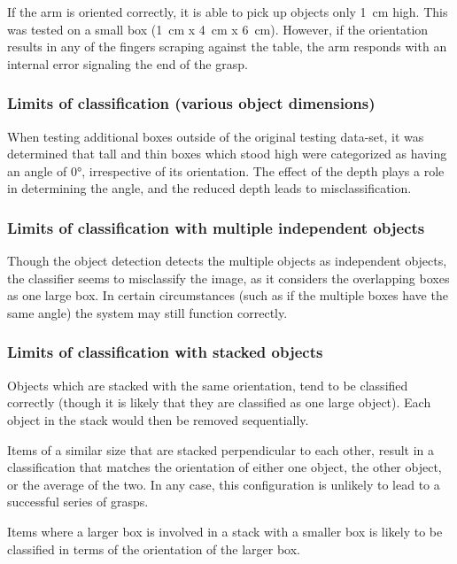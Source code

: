 \documentclass[letterpaper, 10 pt, conference]{conf/ieeeconf}  %
\begin{document}
If the arm is oriented correctly, it is able to pick up objects only
\SI{1}{\centi\meter} high. This was tested on a small box (\SI{1}{\centi\meter}
x \SI{4}{\centi\meter} x \SI{6}{\centi\meter}). However, if the orientation
results in any of the fingers scraping against the table, the arm responds with
an internal error signaling the end of the grasp.

\subsubsection{Limits of classification (various object dimensions)}
When testing additional boxes outside of the original testing data-set, it was
determined that tall and thin boxes which stood high were categorized as having
an angle of \ang{0}, irrespective of its orientation. The effect of the depth
plays a role in determining the angle, and the reduced depth leads to
misclassification.

\subsubsection{Limits of classification with multiple independent objects}
Though the object detection detects the multiple objects as independent objects,
the classifier seems to misclassify the image, as it considers the overlapping
boxes as one large box. In certain circumstances (such as if the multiple boxes
have the same angle) the system may still function correctly.

\subsubsection{Limits of classification with stacked objects}
Objects which are stacked with the same orientation, tend to be classified
correctly (though it is likely that they are classified as one large object).
Each object in the stack would then be removed sequentially.

Items of a similar size that are stacked perpendicular to each other, result in
a classification that matches the orientation of either one object, the other
object, or the average of the two. In any case, this configuration is unlikely
to lead to a successful series of grasps.

Items where a larger box is involved in a stack with a smaller box is likely to
be classified in terms of the orientation of the larger box.

\end{document}
